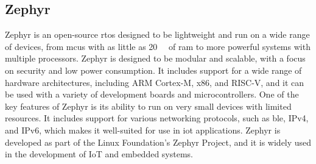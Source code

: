 \subsection{Zephyr}
Zephyr is an \gls{open-source} \gls{rtos} designed to be lightweight and run on a wide range of devices, from \gls{mcu}s with as little as \qty{20}{\kilo\byte} of \gls{ram} to more powerful systems with multiple processors. Zephyr is designed to be modular and scalable, with a focus on security and low power consumption. It includes support for a wide range of hardware architectures, including ARM Cortex-M, x86, and RISC-V, and it can be used with a variety of development boards and microcontrollers. One of the key features of Zephyr is its ability to run on very small devices with limited resources. It includes support for various networking protocols, such as \gls{ble}, IPv4, and IPv6, which makes it well-suited for use in \gls{iot} applications. Zephyr is developed as part of the Linux Foundation's Zephyr Project, and it is widely used in the development of IoT and embedded systems.

